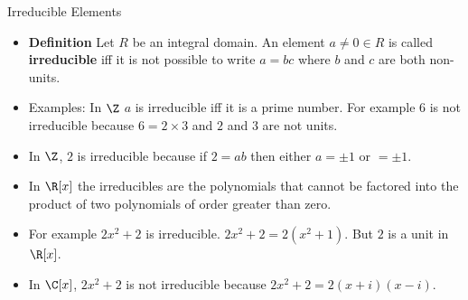 \documentclass{beamer}
\begin{document}
\begin{frame}{Irreducible Elements}

\begin{itemize}
  \item \textbf{Definition} Let $R$ be an integral domain. An element $a\not=0\in R$ is called  \textbf{irreducible} iff it is not possible to write $a=bc$ where
  $b$ and $c$ are both non-units.
  \item Examples: In $\Z$ $a$ is irreducible iff it is a prime number. For example $6$ is not irreducible because $6=2\times 3$ and $2$ and $3$ are not units.
  \item In $\Z$, $2$ is irreducible because if $2=ab$ then either $a=\pm1$ or $=\pm1$.
  \item In $\R[x]$ the irreducibles are the polynomials that cannot be factored into the product of two polynomials of order greater than zero.
  \item For example $2x^2 + 2$ is irreducible. $2x^2 + 2 = 2 (x^2 + 1)$. But $2$ is a unit in $\R[x]$.
  \item In $\C[x]$, $2x^2+2$ is not irreducible because $2x^2+2= 2(x+i)(x-i)$.
\end{itemize}

\end{frame}


\end{document}

